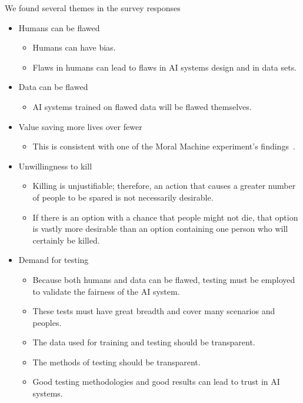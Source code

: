 \documentclass{report}
\begin{document}
We found several themes in the survey responses
\begin{itemize}
    \item Humans can be flawed
    \begin{itemize}
        \item Humans can have bias.
        \item Flaws in humans can lead to flaws in AI systems design and in data sets.
    \end{itemize}
    
    \item Data can be flawed
    \begin{itemize}
        \item AI systems trained on flawed data will be flawed themselves.
    \end{itemize}
    
    \item Value saving more lives over fewer
    \begin{itemize}
        \item This is consistent with one of the Moral Machine experiment's
        findings~\cite{awad2018moral}.
    \end{itemize}
    
    \item Unwillingness to kill
    \begin{itemize}
        \item Killing is unjustifiable; therefore, an action that causes a greater number of people
        to be spared is not necessarily desirable.
        \item If there is an option with a chance that people might not die, that option is vastly
        more desirable than an option containing one person who will certainly be killed.
    \end{itemize}
    
    \item Demand for testing
    \begin{itemize}
        \item Because both humans and data can be flawed, testing must be employed to validate the
        fairness of the AI system.
        \item These tests must have great breadth and cover many scenarios and peoples.
        \item The data used for training and testing should be transparent.
        \item The methods of testing should be transparent.
        \item Good testing methodologies and good results can lead to trust in AI systems.
    \end{itemize}
\end{itemize}
\end{document}

